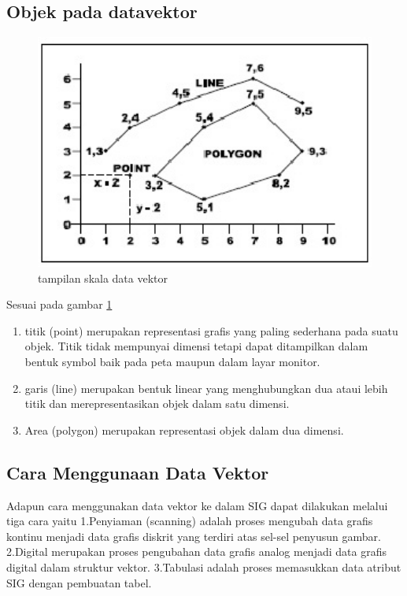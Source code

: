 \subsection {Objek pada datavektor}
\begin{figure}[ht]
\centerline{\includegraphics[width=1\textwidth] {figures/vektor02.JPG}}
\caption{tampilan skala data vektor}
\label{vektor02}
\end{figure}
Sesuai pada gambar \ref{vektor02} 
\begin{enumerate}
Objek yang dibangun terbagi menjadi tiga bagian lagi, yaitu berupa titik (point), garis (line), dan area (polygon). 
\item titik (point) merupakan representasi grafis yang paling sederhana pada suatu objek. Titik tidak mempunyai dimensi tetapi dapat ditampilkan dalam bentuk symbol baik pada peta maupun dalam layar monitor.
\item garis (line) merupakan bentuk linear yang menghubungkan dua ataui lebih titik dan merepresentasikan objek dalam satu dimensi. 
\item Area (polygon) merupakan representasi objek dalam dua dimensi.
\end{enumerate}

\subsection { Cara Menggunaan Data Vektor}
Adapun cara menggunakan data vektor ke dalam SIG dapat dilakukan melalui tiga cara yaitu 
1.Penyiaman (scanning) adalah proses mengubah data grafis kontinu menjadi data grafis diskrit yang terdiri atas sel-sel penyusun gambar.
2.Digital merupakan proses pengubahan data grafis analog menjadi data grafis digital dalam struktur vektor.
3.Tabulasi adalah proses memasukkan data atribut SIG dengan pembuatan tabel.

